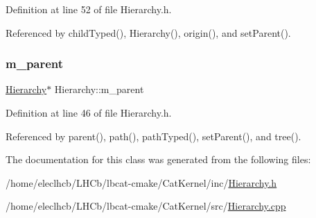 Definition at line 52 of file Hierarchy.\+h.



Referenced by child\+Typed(), Hierarchy(), origin(), and set\+Parent().

\mbox{\label{classHierarchy_a5814bb280d4e8539ab25ab6cbfb9cc4f}} 
\subsubsection{\texorpdfstring{m\+\_\+parent}{m\_parent}}
{\footnotesize\ttfamily \hyperlink{classHierarchy}{Hierarchy}$\ast$ Hierarchy\+::m\+\_\+parent\hspace{0.3cm}{\ttfamily [private]}}



Definition at line 46 of file Hierarchy.\+h.



Referenced by parent(), path(), path\+Typed(), set\+Parent(), and tree().



The documentation for this class was generated from the following files\+:\begin{DoxyCompactItemize}
\item 
/home/eleclhcb/\+L\+H\+Cb/lbcat-\/cmake/\+Cat\+Kernel/inc/\hyperlink{Hierarchy_8h}{Hierarchy.\+h}\item 
/home/eleclhcb/\+L\+H\+Cb/lbcat-\/cmake/\+Cat\+Kernel/src/\hyperlink{Hierarchy_8cpp}{Hierarchy.\+cpp}\end{DoxyCompactItemize}
